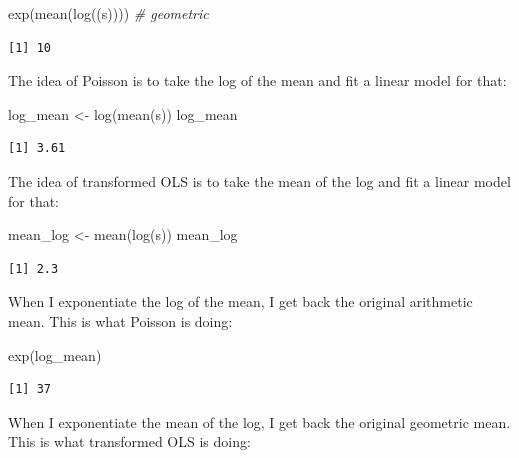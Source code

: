 \documentclass[
  letterpaper,
  DIV=11,
  numbers=noendperiod]{scrreprt}
\newenvironment{Shaded}{}{}
\newcommand{\CommentTok}[1]{\textcolor[rgb]{0.38,0.63,0.69}{\textit{#1}}}
\newcommand{\FunctionTok}[1]{\textcolor[rgb]{0.02,0.16,0.49}{#1}}
\newcommand{\NormalTok}[1]{#1}
\newcommand{\OtherTok}[1]{\textcolor[rgb]{0.00,0.44,0.13}{#1}}
\begin{document}
\begin{Shaded}
\begin{Highlighting}[]
\FunctionTok{exp}\NormalTok{(}\FunctionTok{mean}\NormalTok{(}\FunctionTok{log}\NormalTok{((s)))) }\CommentTok{\# geometric}
\end{Highlighting}
\end{Shaded}

\begin{verbatim}
[1] 10
\end{verbatim}

The idea of Poisson is to take the log of the mean and fit a linear
model for that:

\begin{Shaded}
\begin{Highlighting}[]
\NormalTok{log\_mean }\OtherTok{\textless{}{-}} \FunctionTok{log}\NormalTok{(}\FunctionTok{mean}\NormalTok{(s))}
\NormalTok{log\_mean}
\end{Highlighting}
\end{Shaded}

\begin{verbatim}
[1] 3.61
\end{verbatim}

The idea of transformed OLS is to take the mean of the log and fit a
linear model for that:

\begin{Shaded}
\begin{Highlighting}[]
\NormalTok{mean\_log }\OtherTok{\textless{}{-}} \FunctionTok{mean}\NormalTok{(}\FunctionTok{log}\NormalTok{(s))}
\NormalTok{mean\_log}
\end{Highlighting}
\end{Shaded}

\begin{verbatim}
[1] 2.3
\end{verbatim}

When I exponentiate the log of the mean, I get back the original
arithmetic mean. This is what Poisson is doing:

\begin{Shaded}
\begin{Highlighting}[]
\FunctionTok{exp}\NormalTok{(log\_mean)}
\end{Highlighting}
\end{Shaded}

\begin{verbatim}
[1] 37
\end{verbatim}

When I exponentiate the mean of the log, I get back the original
geometric mean. This is what transformed OLS is doing:
\end{document}
